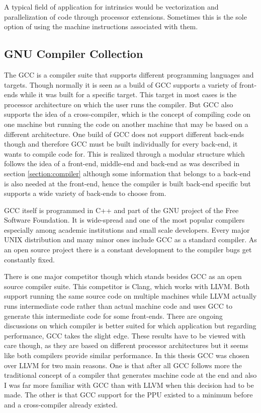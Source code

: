 {A typical field of application for intrinsics would be vectorization and parallelization of code through processor extensions.
Sometimes this is the sole option of using the machine instructions associated with them.

\subsection{GNU Compiler Collection}
\label{sec:GCC}
The \ac{GCC} is a compiler suite that supports different programming languages and targets.
Though normally it is seen as a build of \ac{GCC} supports a variety of front-ends while it was built for a specific target.
This target in most cases is the processor architecture on which the user runs the compiler.
But \ac{GCC} also supports the idea of a cross-compiler, which is the concept of compiling code on one machine but running the code on another machine that may be based on a different architecture.
One build of \ac{GCC} does not support different back-ends though and therefore \ac{GCC} must be built individually for every back-end, it wants to compile code for.
This is realized through a modular structure which follows the idea of a front-end, middle-end and back-end as was described in section \ref{section:compiler} although some information that belongs to a back-end is also needed at the front-end, hence the compiler is built back-end specific but supports a wide variety of back-ends to choose from.

\ac{GCC} itself is programmed in C++ and part of the GNU project of the Free Software Foundation.
It is wide-spread and one of the most popular compilers especially among academic institutions and small scale developers.
Every major UNIX distribution and many minor ones include \ac{GCC} as a standard compiler.\cite{definitveGCCGuide:introduction}
As an open source project there is a constant development to the compiler bugs get constantly fixed.

There is one major competitor though which stands besides \ac{GCC} as an open source compiler suite.
This competitor is Clang, which works with \ac{LLVM}.
Both support running the same source code on multiple machines while \ac{LLVM} actually runs intermediate code rather than actual machine code and uses \ac{GCC} to generate this intermediate code for some front-ends.
There are ongoing discussions on which compiler is better suited for which application but regarding performance, \ac{GCC} takes the slight edge. \citep{llvmgcceisc} \citep{llvmgccarm}
These results have to be viewed with care though, as they are based on different processor architectures but it seems like both compilers provide similar performance.
In this thesis \ac{GCC} was chosen over \ac{LLVM} for two main reasons.
One is that after all \ac{GCC} follows more the traditional concept of a compiler that generates machine code at the end and also I was far more familiar with \ac{GCC} than with \ac{LLVM} when this decision had to be made.
The other is that \ac{GCC} support for the \ac{PPU} existed to a minimum before and a cross-compiler already existed.

}
